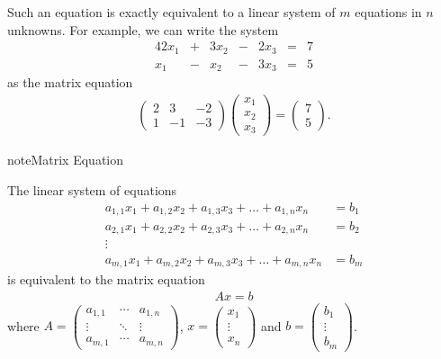 \documentclass[letterpaper,10pt,english]{jupyterBook}
\begin{document}
\sphinxAtStartPar
Such an equation is exactly equivalent to a linear system of \(m\) equations in \(n\) unknowns. For example, we can write the system
\begin{alignat*}{4}
2x_1 & {}+{} & 3x_2 & {}-{} & 2x_3 & {}={} & 7 \\
  x_1 & {}-{} & x_2 & {}-{} & 3x_3 & {}={} & 5
\end{alignat*}
\sphinxAtStartPar
as the matrix equation
\begin{equation*}
\begin{split}
\begin{pmatrix} 2 & 3 & -2\\
1 & -1 & -3\end{pmatrix}\begin{pmatrix}x_1\\x_2\\x_3\end{pmatrix} = \begin{pmatrix}7\\5\end{pmatrix}.
\end{split}
\end{equation*}
\begin{sphinxadmonition}{note}{Matrix Equation}

\sphinxAtStartPar
The linear system of equations
\begin{align*}
a_{1,1} x_1 + a_{1,2} x_2 + a_{1,3} x_3 + \dots + a_{1,n} x_n &= b_1 \\

   a_{2,1} x_1 + a_{2,2} x_2 + a_{2,3} x_3 + \dots + a_{2,n} x_n &= b_2\\
                                                                     \vdots \\
 a_{m,1} x_1 + a_{m,2} x_2 + a_{m,3} x_3 + \dots + a_{m,n} x_n &= b_m
\end{align*}
\sphinxAtStartPar
is equivalent to the matrix equation
\begin{equation*}
\begin{split}Ax=b\end{split}
\end{equation*}
\sphinxAtStartPar
where \(A=\begin{pmatrix}
a_{1,1} & \cdots & a_{1,n}\\
\vdots & \ddots & \vdots\\
a_{m,1} & \cdots & a_{m,n}
\end{pmatrix}\), \(x=\begin{pmatrix}x_1\\ \vdots \\ x_n\end{pmatrix}\) and \(b=\begin{pmatrix}b_1\\ \vdots \\b_m\end{pmatrix}\).
\end{sphinxadmonition}
\end{document}
